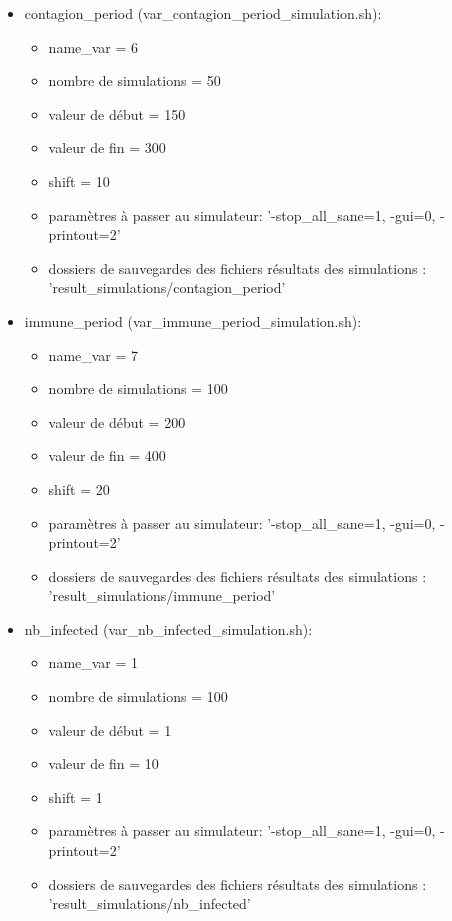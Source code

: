 \documentclass[a4paper, 11pt]{article}
\begin{document}
			\begin{itemize}
				\item contagion\_period (var\_contagion\_period\_simulation.sh):
				\begin{itemize}
					\item name\_var = 6
					\item nombre de simulations = 50
					\item valeur de début = 150
					\item valeur de fin = 300
					\item shift = 10
					\item paramètres à passer au simulateur: '-stop\_all\_sane=1, -gui=0, -printout=2'
					\item dossiers de sauvegardes des fichiers résultats des simulations : 'result\_simulations/contagion\_period'
				\end{itemize}
				
				\item immune\_period (var\_immune\_period\_simulation.sh):
				\begin{itemize}
					\item name\_var = 7
					\item nombre de simulations = 100
					\item valeur de début = 200
					\item valeur de fin = 400
					\item shift = 20
					\item paramètres à passer au simulateur: '-stop\_all\_sane=1, -gui=0, -printout=2'
					\item dossiers de sauvegardes des fichiers résultats des simulations : 'result\_simulations/immune\_period'
				\end{itemize}
				
				\item nb\_infected (var\_nb\_infected\_simulation.sh):
				\begin{itemize}
					\item name\_var = 1
					\item nombre de simulations = 100
					\item valeur de début = 1
					\item valeur de fin = 10
					\item shift = 1
					\item paramètres à passer au simulateur: '-stop\_all\_sane=1, -gui=0, -printout=2'
					\item dossiers de sauvegardes des fichiers résultats des simulations : 'result\_simulations/nb\_infected'
				\end{itemize}
				

\end{itemize}
\end{document}
